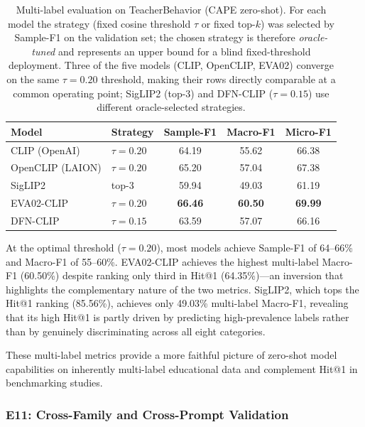 \documentclass[symmetry,article,submit,pdftex,moreauthors]{Definitions/mdpi}
\begin{document}
\begin{table}[H]
\caption{Multi-label evaluation on TeacherBehavior (CAPE zero-shot). For each model the strategy (fixed cosine threshold $\tau$ or fixed top-$k$) was selected by Sample-F1 on the validation set; the chosen strategy is therefore \emph{oracle-tuned} and represents an upper bound for a blind fixed-threshold deployment. Three of the five models (CLIP, OpenCLIP, EVA02) converge on the same $\tau=0.20$ threshold, making their rows directly comparable at a common operating point; SigLIP2 (top-3) and DFN-CLIP ($\tau=0.15$) use different oracle-selected strategies.}
\label{tab:multilabel_eval}
\centering
\small
\begin{tabular}{llccc}
\toprule
\textbf{Model} & \textbf{Strategy} & \textbf{Sample-F1} & \textbf{Macro-F1} & \textbf{Micro-F1} \\
\midrule
CLIP (OpenAI) & $\tau=0.20$ & 64.19 & 55.62 & 66.38 \\
OpenCLIP (LAION) & $\tau=0.20$ & 65.20 & 57.04 & 67.38 \\
SigLIP2 & top-3 & 59.94 & 49.03 & 61.19 \\
EVA02-CLIP & $\tau=0.20$ & \textbf{66.46} & \textbf{60.50} & \textbf{69.99} \\
DFN-CLIP & $\tau=0.15$ & 63.59 & 57.07 & 66.16 \\
\bottomrule
\end{tabular}
\end{table}

At the optimal threshold ($\tau=0.20$), most models achieve Sample-F1 of 64--66\% and Macro-F1 of 55--60\%. EVA02-CLIP achieves the highest multi-label Macro-F1 (60.50\%) despite ranking only third in Hit@1 (64.35\%)---an inversion that highlights the complementary nature of the two metrics. SigLIP2, which tops the Hit@1 ranking (85.56\%), achieves only 49.03\% multi-label Macro-F1, revealing that its high Hit@1 is partly driven by predicting high-prevalence labels rather than by genuinely discriminating across all eight categories.

These multi-label metrics provide a more faithful picture of zero-shot model capabilities on inherently multi-label educational data and complement Hit@1 in benchmarking studies.


\subsubsection{E11: Cross-Family and Cross-Prompt Validation}
\label{sec:e11_ex}
\end{document}
